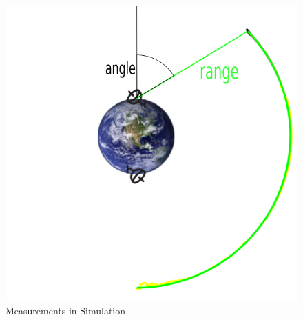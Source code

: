 \documentclass{beamer}
\begin{document}
\begin{frame}
  \begin{figure}
    \includegraphics[scale=0.3]{sim_shot.png}
    \caption{Measurements in Simulation}
  \end{figure}

\end{frame}
\end{document}
